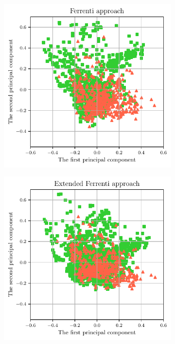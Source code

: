 \documentclass[superscriptaddress,unsortedaddress,
 amsmath,amssymb,
 aps,
]{revtex4-2}
\begin{document}
\begin{figure}%
    \centering
    \begin{subfigure}{0.35\textwidth}
        \centering
        \includegraphics[width=1\textwidth]{figures/pca-2d-plots/01-ferrenti-approach.pdf}
    \end{subfigure}%
    \begin{subfigure}{0.35\textwidth}
        \centering
        \includegraphics[width=1\textwidth]{figures/pca-2d-plots/02-augmented-ferrenti-approach.pdf}

\end{subfigure}
\end{figure}
\end{document}
